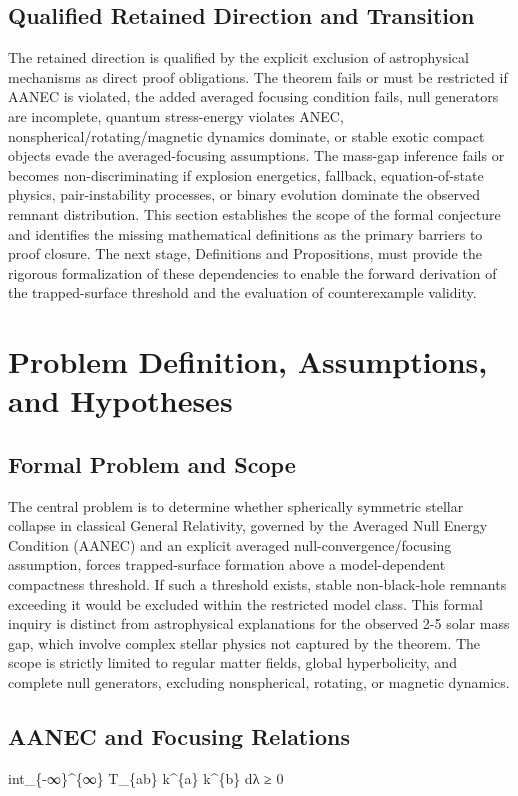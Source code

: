 \documentclass[conference]{IEEEtran}
\begin{document}
\subsection{Qualified Retained Direction and Transition}
The retained direction is qualified by the explicit exclusion of astrophysical mechanisms as direct proof obligations. The theorem fails or must be restricted if AANEC is violated, the added averaged focusing condition fails, null generators are incomplete, quantum stress-energy violates ANEC, nonspherical/rotating/magnetic dynamics dominate, or stable exotic compact objects evade the averaged-focusing assumptions. The mass-gap inference fails or becomes non-discriminating if explosion energetics, fallback, equation-of-state physics, pair-instability processes, or binary evolution dominate the observed remnant distribution. This section establishes the scope of the formal conjecture and identifies the missing mathematical definitions as the primary barriers to proof closure. The next stage, Definitions and Propositions, must provide the rigorous formalization of these dependencies to enable the forward derivation of the trapped-surface threshold and the evaluation of counterexample validity.~\cite{cite_7a407c865faafd11,cite_f634820e22d7a238}

\section{Problem Definition, Assumptions, and Hypotheses}
\subsection{Formal Problem and Scope}
The central problem is to determine whether spherically symmetric stellar collapse in classical General Relativity, governed by the Averaged Null Energy Condition (AANEC) and an explicit averaged null-convergence/focusing assumption, forces trapped-surface formation above a model-dependent compactness threshold. If such a threshold exists, stable non-black-hole remnants exceeding it would be excluded within the restricted model class. This formal inquiry is distinct from astrophysical explanations for the observed 2-5 solar mass gap, which involve complex stellar physics not captured by the theorem. The scope is strictly limited to regular matter fields, global hyperbolicity, and complete null generators, excluding nonspherical, rotating, or magnetic dynamics.

\subsection{AANEC and Focusing Relations}
int\_\{-∞\}\textasciicircum{}\{∞\} T\_\{ab\} k\textasciicircum{}\{a\} k\textasciicircum{}\{b\} dλ ≥ 0
\end{document}
